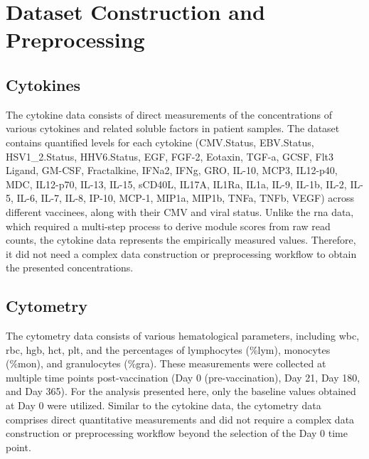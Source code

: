 \documentclass[12pt,a4paper]{report}
\begin{document}




\section{Dataset Construction and Preprocessing}
\subsection{Cytokines}
The cytokine data consists of direct measurements of the concentrations of various cytokines and related soluble factors in patient samples. The dataset contains quantified levels for each cytokine (CMV.Status, EBV.Status, HSV1\_2.Status, HHV6.Status, EGF, FGF-2, Eotaxin, TGF-a, GCSF, Flt3 Ligand, GM-CSF, Fractalkine, IFNa2, IFNg, GRO, IL-10, MCP3, IL12-p40, MDC, IL12-p70, IL-13, IL-15, sCD40L, IL17A, IL1Ra, IL1a, IL-9, IL-1b, IL-2, IL-5, IL-6, IL-7, IL-8, IP-10, MCP-1, MIP1a, MIP1b, TNFa, TNFb, VEGF) across different vaccinees, along with their CMV and viral status. Unlike the \acrshort{rna} data, which required a multi-step process to derive module scores from raw read counts, the cytokine data represents the empirically measured values. Therefore, it did not need a complex data construction or preprocessing workflow to obtain the presented concentrations.

\subsection{Cytometry}
The cytometry data consists of various hematological parameters, including \acrfull{wbc}, \acrfull{rbc}, \acrfull{hgb}, \acrfull{hct}, \acrfull{plt}, and the percentages of lymphocytes (\%\acrshort{lym}), monocytes (\%\acrshort{mon}), and granulocytes (\%\acrshort{gra}). These measurements were collected at multiple time points post-vaccination (Day 0 (pre-vaccination), Day 21, Day 180, and Day 365). For the analysis presented here, only the baseline values obtained at Day 0 were utilized. Similar to the cytokine data, the cytometry data comprises direct quantitative measurements and did not require a complex data construction or preprocessing workflow beyond the selection of the Day 0 time point.
\end{document}
